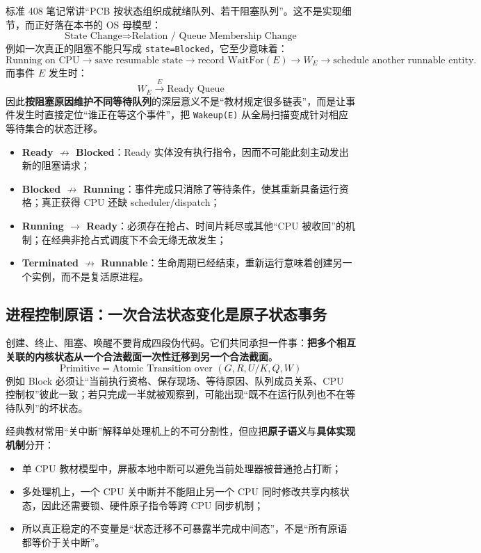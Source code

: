 \documentclass[11pt,a4paper]{ctexart}
\newcommand{\kw}[1]{\textbf{#1}}
\newcommand{\code}[1]{\texttt{#1}}
\begin{document}
标准 408 笔记常讲“PCB 按状态组织成就绪队列、若干阻塞队列”。这不是实现细节，而正好落在本书的 OS 母模型：
\[
\boxed{\text{State Change}\Longrightarrow\text{Relation / Queue Membership Change}}
\]
例如一次真正的阻塞不能只写成 \code{state=Blocked}，它至少意味着：
\[
\text{Running on CPU}
\rightarrow
\text{save resumable state}
\rightarrow
\text{record WaitFor}(E)
\rightarrow
W_E
\rightarrow
\text{schedule another runnable entity}.
\]
而事件 $E$ 发生时：
\[
W_E\xrightarrow{E}\text{Ready Queue}
\]
因此\kw{按阻塞原因维护不同等待队列}的深层意义不是“教材规定很多链表”，而是让事件发生时直接定位“谁正在等这个事件”，把 \code{Wakeup(E)} 从全局扫描变成针对相应等待集合的状态迁移。

\begin{exam}
\begin{itemize}
\item \kw{Ready $\not\to$ Blocked}：Ready 实体没有执行指令，因而不可能此刻主动发出新的阻塞请求；
\item \kw{Blocked $\not\to$ Running}：事件完成只消除了等待条件，使其重新具备运行资格；真正获得 CPU 还缺 scheduler/dispatch；
\item \kw{Running $\to$ Ready}：必须存在抢占、时间片耗尽或其他“CPU 被收回”的机制；在经典非抢占式调度下不会无缘无故发生；
\item \kw{Terminated $\not\to$ Runnable}：生命周期已经结束，重新运行意味着创建另一个实例，而不是复活原进程。
\end{itemize}
\end{exam}

\subsection{进程控制原语：一次合法状态变化是原子状态事务}

创建、终止、阻塞、唤醒不要背成四段伪代码。它们共同承担一件事：\kw{把多个相互关联的内核状态从一个合法截面一次性迁移到另一个合法截面}。
\[
\boxed{
\text{Primitive}
=
\text{Atomic Transition over }(G,R,U/K,Q,W)
}
\]
例如 Block 必须让“当前执行资格、保存现场、等待原因、队列成员关系、CPU 控制权”彼此一致；若只完成一半就被观察到，可能出现“既不在运行队列也不在等待队列”的坏状态。

经典教材常用“关中断”解释单处理机上的不可分割性，但应把\kw{原子语义}与\kw{具体实现机制}分开：
\begin{itemize}
\item 单 CPU 教材模型中，屏蔽本地中断可以避免当前处理器被普通抢占打断；
\item 多处理机上，一个 CPU 关中断并不能阻止另一个 CPU 同时修改共享内核状态，因此还需要锁、硬件原子指令等跨 CPU 同步机制；
\item 所以真正稳定的不变量是“状态迁移不可暴露半完成中间态”，不是“所有原语都等价于关中断”。
\end{itemize}
\end{document}
